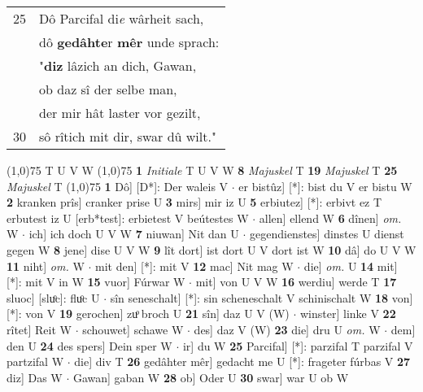 \documentclass[8pt,a4paper,notitlepage]{article}
\begin{document}
\begin{table}[ht]
\begin{minipage}[t]{0.5\linewidth}
\begin{tabular}{rl}
25 & Dô Parcifal di\textit{e} wârheit sach,\\ 
 & dô \textbf{gedâhte}r \textbf{mêr} unde sprach:\\ 
 & "\textbf{diz} lâzich an dich, Gawan,\\ 
 & ob daz sî der selbe man,\\ 
 & der mir hât laster vor gezilt,\\ 
30 & sô rîtich mit dir, swar dû wilt."\\ 
\end{tabular}
\scriptsize
\line(1,0){75} \newline
T U V W \newline
\line(1,0){75} \newline
\textbf{1} \textit{Initiale} T U V W  \textbf{8} \textit{Majuskel} T  \textbf{19} \textit{Majuskel} T  \textbf{25} \textit{Majuskel} T  \newline
\line(1,0){75} \newline
\textbf{1} Dô] [D*]: Der waleis V  $\cdot$ er bistûz] [*]: bist du V er bistu W \textbf{2} kranken prîs] cranker prise U \textbf{3} mirs] mir iz U \textbf{5} erbiutez] [*]: erbivt ez T erbutest iz U [erb*test]: erbietest V beútestes W  $\cdot$ allen] ellend W \textbf{6} dînen] \textit{om.} W  $\cdot$ ich] ich doch U V W \textbf{7} niuwan] Nit dan U  $\cdot$ gegendienstes] dinstes U dienst gegen W \textbf{8} jene] dise U V W \textbf{9} lît dort] ist dort U V dort ist W \textbf{10} dâ] do U V W \textbf{11} niht] \textit{om.} W  $\cdot$ mit den] [*]: mit V \textbf{12} mac] Nit mag W  $\cdot$ die] \textit{om.} U \textbf{14} mit] [*]: mit V in W \textbf{15} vuor] Fúrwar W  $\cdot$ mit] von U V W \textbf{16} werdiu] werde T \textbf{17} sluoc] [sluͦc]: fluͦc U  $\cdot$ sîn seneschalt] [*]: sin scheneschalt V schinischalt W \textbf{18} von] [*]: von V \textbf{19} gerochen] zuͦ broch U \textbf{21} sîn] daz U V (W)  $\cdot$ winster] linke V \textbf{22} rîtet] Reit W  $\cdot$ schouwet] schawe W  $\cdot$ des] daz V (W) \textbf{23} die] dru U \textit{om.} W  $\cdot$ dem] den U \textbf{24} des spers] Dein sper W  $\cdot$ ir] du W \textbf{25} Parcifal] [*]: parzifal T parzifal V partzifal W  $\cdot$ die] div T \textbf{26} gedâhter mêr] gedacht me U [*]: frageter fúrbas V \textbf{27} diz] Das W  $\cdot$ Gawan] gaban W \textbf{28} ob] Oder U \textbf{30} swar] war U ob W \newline
\end{minipage}
\end{table}
\end{document}
